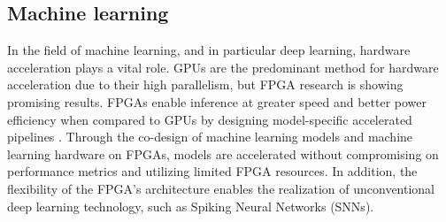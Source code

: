 \subsection{Machine learning}
\label{sec:ml}
In the field of machine learning, and in particular deep learning, hardware acceleration plays a vital role. GPUs are the predominant method for hardware acceleration due to their high parallelism, but FPGA research is showing promising results. FPGAs enable inference at greater speed and better power efficiency when compared to GPUs \cite{hw-efficiency-compare} by designing model-specific accelerated pipelines \cite{ml-energy-efficient-cnn}. Through the co-design of machine learning models and machine learning hardware on FPGAs, models are accelerated without compromising on performance metrics and utilizing limited FPGA resources. In addition, the flexibility of the FPGA's architecture enables the realization of unconventional deep learning technology, such as Spiking Neural Networks (SNNs). 


